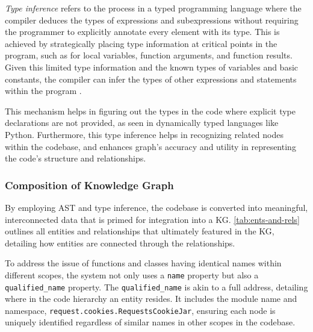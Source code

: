 \textit{Type inference} refers to the process in a typed programming language where the compiler deduces the types of expressions and subexpressions without requiring the programmer to explicitly annotate every element with its type. This is achieved by strategically placing type information at critical points in the program, such as for local variables, function arguments, and function results. Given this limited type information and the known types of variables and basic constants, the compiler can infer the types of other expressions and statements within the program  \cite{Cardelli_1985}. 

This mechanism helps in figuring out the types in the code where explicit type declarations are not provided, as seen in dynamically typed languages like Python. Furthermore, this type inference helps in recognizing related nodes within the codebase, and enhances graph's accuracy and utility in representing the code's structure and relationships.






\subsubsection{Composition of Knowledge Graph}
By employing AST and type inference, the codebase is converted into meaningful, interconnected data that is primed for integration into a KG. \autoref{tab:ents-and-rels} outlines all entities and relationships that ultimately featured in the KG, detailing how entities are connected through the relationships.

To address the issue of functions and classes having identical names within different scopes, the system not only uses a \texttt{name} property but also a \texttt{qualified\_name} property. The \texttt{qualified\_name} is akin to a full address, detailing where in the code hierarchy an entity resides. It includes the module name and namespace, \eg \texttt{request.cookies.RequestsCookieJar}, ensuring each node is uniquely identified regardless of similar names in other scopes in the codebase. 





